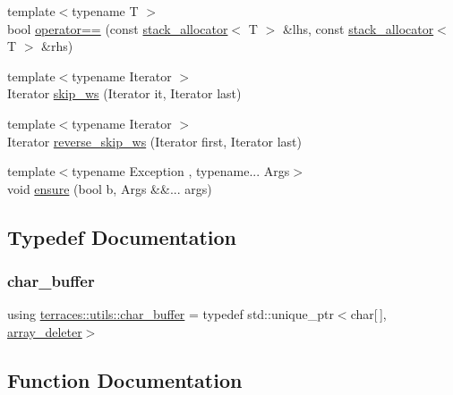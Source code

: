 \begin{DoxyCompactItemize}
\item 
{\footnotesize template$<$typename T $>$ }\\bool \hyperlink{namespaceterraces_1_1utils_a7588b460cbed23936a666ce2c411e30b}{operator==} (const \hyperlink{classterraces_1_1utils_1_1stack__allocator}{stack\+\_\+allocator}$<$ T $>$ \&lhs, const \hyperlink{classterraces_1_1utils_1_1stack__allocator}{stack\+\_\+allocator}$<$ T $>$ \&rhs)
\item 
{\footnotesize template$<$typename Iterator $>$ }\\Iterator \hyperlink{namespaceterraces_1_1utils_a72c9d3a03a496794590f5c9d7a01aa58}{skip\+\_\+ws} (Iterator it, Iterator last)
\item 
{\footnotesize template$<$typename Iterator $>$ }\\Iterator \hyperlink{namespaceterraces_1_1utils_a8f537b0f3154a2a1c21650098e16797e}{reverse\+\_\+skip\+\_\+ws} (Iterator first, Iterator last)
\item 
{\footnotesize template$<$typename Exception , typename... Args$>$ }\\void \hyperlink{namespaceterraces_1_1utils_aae29deaf7ae1e950beddb248d2591ce2}{ensure} (bool b, Args \&\&... args)
\end{DoxyCompactItemize}


\subsection{Typedef Documentation}
\mbox{\label{namespaceterraces_1_1utils_a899529841c01a7e7152ac5ef8496c024}} 
\subsubsection{\texorpdfstring{char\+\_\+buffer}{char\_buffer}}
{\footnotesize\ttfamily using \hyperlink{namespaceterraces_1_1utils_a899529841c01a7e7152ac5ef8496c024}{terraces\+::utils\+::char\+\_\+buffer} = typedef std\+::unique\+\_\+ptr$<$char\mbox{[}$\,$\mbox{]}, \hyperlink{classterraces_1_1utils_1_1array__deleter}{array\+\_\+deleter}$>$}



\subsection{Function Documentation}
\mbox{\label{namespaceterraces_1_1utils_a0179dbbfb1f4aa737076b3f47fdccdb4}} 
